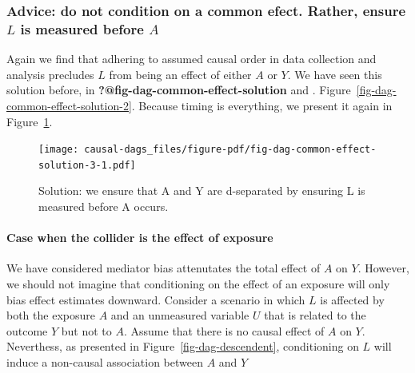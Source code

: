 \documentclass[
  singlecolumn,
  9pt]{article}
\let\oldparagraph\paragraph
\renewcommand{\paragraph}[1]{\oldparagraph{#1}\mbox{}}
\begin{document}
\subsubsection{\texorpdfstring{Advice: do not condition on a common
efect. Rather, ensure \(L\) is measured before
\(A\)}{Advice: do not condition on a common efect. Rather, ensure L is measured before A}}\label{advice-do-not-condition-on-a-common-efect.-rather-ensure-l-is-measured-before-a}

Again we find that adhering to assumed causal order in data collection
and analysis precludes \(L\) from being an effect of either \(A\) or
\(Y\). We have seen this solution before, in
\textbf{?@fig-dag-common-effect-solution} and .
Figure~\ref{fig-dag-common-effect-solution-2}. Because timing is
everything, we present it again in
Figure~\ref{fig-dag-common-effect-solution-3}.

\begin{figure}

{\centering \texttt{[image: causal-dags\_files/figure-pdf/fig-dag-common-effect-solution-3-1.pdf]}

}

\caption{\label{fig-dag-common-effect-solution-3}Solution: we ensure
that A and Y are d-separated by ensuring L is measured before A occurs.}

\end{figure}

\paragraph{Case when the collider is the effect of
exposure}\label{case-when-the-collider-is-the-effect-of-exposure}

We have considered mediator bias attenutates the total effect of \(A\)
on \(Y\). However, we should not imagine that conditioning on the effect
of an exposure will only bias effect estimates downward. Consider a
scenario in which \(L\) is affected by both the exposure \(A\) and an
unmeasured variable \(U\) that is related to the outcome \(Y\) but not
to \(A\). Assume that there is no causal effect of \(A\) on \(Y\).
Neverthess, as presented in Figure~\ref{fig-dag-descendent},
conditioning on \(L\) will induce a non-causal association between \(A\)
and \(Y\)
\end{document}
